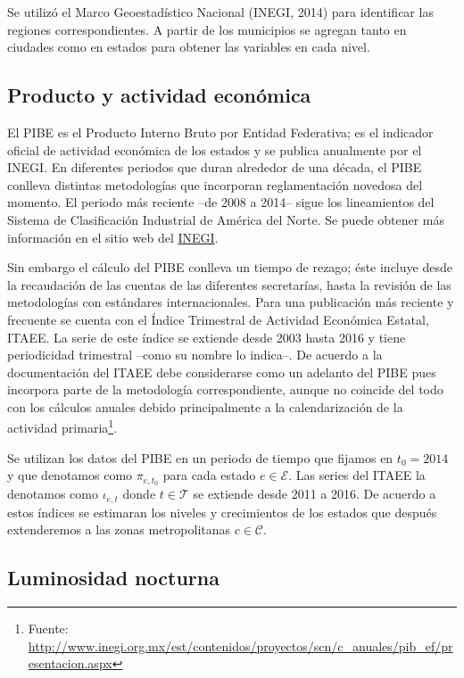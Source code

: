 \documentclass[]{article}
\let\rmarkdownfootnote\footnote%
\def\footnote{\protect\rmarkdownfootnote}
\begin{document}
Se utilizó el Marco Geoestadístico Nacional (INEGI, 2014) para
identificar las regiones correspondientes. A partir de los municipios se
agregan tanto en ciudades como en estados para obtener las variables en
cada nivel.

\subsection{Producto y actividad
económica}\label{producto-y-actividad-economica}

El PIBE es el Producto Interno Bruto por Entidad Federativa; es el
indicador oficial de actividad económica de los estados y se publica
anualmente por el INEGI. En diferentes periodos que duran alrededor de
una década, el PIBE conlleva distintas metodologías que incorporan
reglamentación novedosa del momento. El periodo más reciente --de 2008 a
2014-- sigue los lineamientos del Sistema de Clasificación Industrial de
América del Norte. Se puede obtener más información en el sitio web del
\href{http://www.inegi.org.mx/est/contenidos/proyectos/scn/c_anuales/pib_ef/presentacion.aspx}{INEGI}.

Sin embargo el cálculo del PIBE conlleva un tiempo de rezago; éste
incluye desde la recaudación de las cuentas de las diferentes
secretarías, hasta la revisión de las metodologías con estándares
internacionales. Para una publicación más reciente y frecuente se cuenta
con el Índice Trimestral de Actividad Económica Estatal, ITAEE. La serie
de este índice se extiende desde 2003 hasta 2016 y tiene periodicidad
trimestral --como su nombre lo indica--. De acuerdo a la documentación
del ITAEE debe considerarse como un adelanto del PIBE pues incorpora
parte de la metodología correspondiente, aunque no coincide del todo con
los cálculos anuales debido principalmente a la calendarización de la
actividad primaria\footnote{Fuente:
  \url{http://www.inegi.org.mx/est/contenidos/proyectos/scn/c_anuales/pib_ef/presentacion.aspx}}.

Se utilizan los datos del PIBE en un periodo de tiempo que fijamos en
\(t_0 = 2014\) y que denotamos como \(\pi_{e,t_0}\) para cada estado
\(e \in \mathcal E\). Las series del ITAEE la denotamos como
\(\iota_{e,t}\) donde \(t \in \mathcal T\) se extiende desde 2011 a
2016. De acuerdo a estos índices se estimaran los niveles y crecimientos
de los estados que después extenderemos a las zonas metropolitanas
\(c \in \mathcal C\).

\subsection{Luminosidad nocturna}\label{luminosidad-nocturna}
\end{document}
